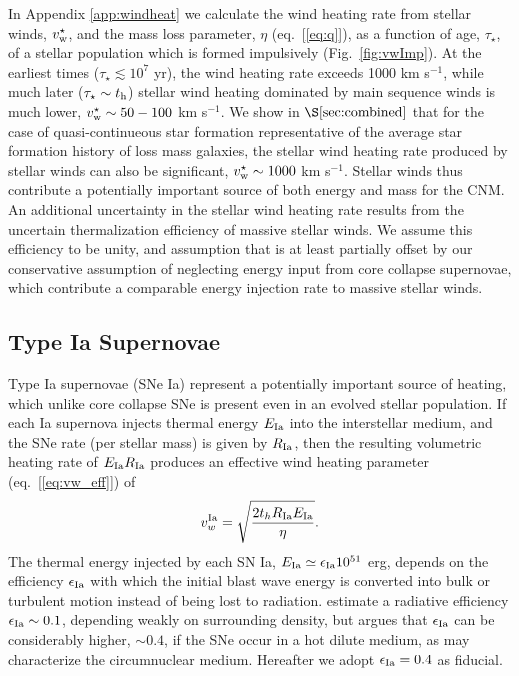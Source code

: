 \documentclass[usenatbib,fleqn]{mn2e}
\begin{document}
In Appendix \ref{app:windheat} we calculate the wind heating rate from
stellar winds, $v_{\rm w}^{\star}$, and the mass loss parameter,
$\eta$ (eq.~[\ref{eq:q}]), as a function of age, $\tau_{\star}$, of a
stellar population which is formed impulsively (Fig.~\ref{fig:vwImp}).  
At the earliest times ($\tau_{\star} \lesssim 10^{7}$ yr), the wind
heating rate exceeds 1000 km s$^{-1}$, while much later ($\tau_{\star}
\sim t_{\rm h}$) stellar wind heating dominated by main sequence winds
is much lower, $v^{\star}_{\rm w} \sim 50-100 $ km s$^{-1}$.  We show
in $\S\ref{sec:combined}$ that for the case of quasi-continueous star
formation representative of the average star formation history of loss
mass galaxies, the stellar wind heating rate produced by stellar winds
can also be significant, $v_{\rm w}^{\star} \sim 1000$ km s$^{-1}$.  
Stellar winds thus contribute a potentially important source of both
energy and mass for the CNM.  An additional uncertainty in the stellar wind heating rate results from the uncertain thermalization efficiency of massive stellar winds.  We assume this efficiency to be unity, and assumption that is at least partially offset by our conservative assumption of neglecting energy input from core collapse supernovae, which contribute a comparable energy injection rate to massive stellar winds.  

\subsection{Type Ia Supernovae} 

Type Ia supernovae (SNe Ia) represent a potentially important source of heating, which unlike core collapse SNe is present even in an evolved stellar population.  If each Ia supernova injects thermal energy $E_{\rm Ia}$ into the interstellar medium, and the SNe rate (per stellar mass) is given by $R_{\rm   Ia}$, then the resulting volumetric heating rate of $E_{\rm Ia}R_{\rm  Ia}$ produces an effective wind heating parameter (eq.~[\ref{eq:vw_eff}]) of \begin{align} v_{w}^{\rm Ia} =\sqrt{\frac{2 t_h R_{\rm Ia}
E_{\rm Ia}}{\eta}} \label{eq:vw_sne}.
\end{align} The thermal energy injected by each SN Ia, $E_{\rm Ia} \simeq
\epsilon_{\rm Ia} 10^{51}$ erg, depends on the efficiency $\epsilon_{\rm Ia}$
with which the initial blast wave energy is converted into bulk or turbulent
motion instead of being lost to radiation.  \cite{Thornton+98}
estimate a radiative efficiency $\epsilon_{\rm Ia} \sim 0.1$,
depending weakly on surrounding density, but \citet{Sharma+14} argues
that $\epsilon_{\rm Ia}$ can be considerably higher, $\sim 0.4$, if
the SNe occur in a hot dilute medium, as may characterize the circumnuclear medium.  Hereafter we adopt $\epsilon_{\rm Ia} = 0.4$ as fiducial.
\end{document}

